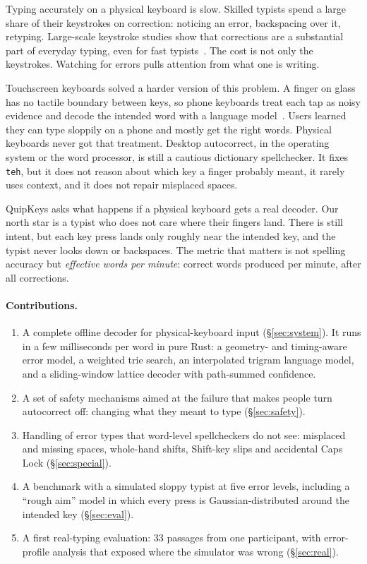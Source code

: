 \documentclass[11pt,a4paper]{article}
\newcommand{\qk}{QuipKeys}
\newcommand{\ttw}[1]{\texttt{#1}}
\begin{document}
Typing accurately on a physical keyboard is slow. Skilled typists spend a large share of their keystrokes on correction: noticing an error, backspacing over it, retyping. Large-scale keystroke studies show that corrections are a substantial part of everyday typing, even for fast typists~\citep{dhakal2018}. The cost is not only the keystrokes. Watching for errors pulls attention from what one is writing.

Touchscreen keyboards solved a harder version of this problem. A finger on glass has no tactile boundary between keys, so phone keyboards treat each tap as noisy evidence and decode the intended word with a language model~\citep{goodman2002,kristensson2004,vertanen2015}. Users learned they can type sloppily on a phone and mostly get the right words. Physical keyboards never got that treatment. Desktop autocorrect, in the operating system or the word processor, is still a cautious dictionary spellchecker. It fixes \ttw{teh}, but it does not reason about which key a finger probably meant, it rarely uses context, and it does not repair misplaced spaces.

\qk{} asks what happens if a physical keyboard gets a real decoder. Our north star is a typist who does not care where their fingers land. There is still intent, but each key press lands only roughly near the intended key, and the typist never looks down or backspaces. The metric that matters is not spelling accuracy but \emph{effective words per minute}: correct words produced per minute, after all corrections.

\paragraph{Contributions.}
\begin{enumerate}
\item A complete offline decoder for physical-keyboard input (\S\ref{sec:system}). It runs in a few milliseconds per word in pure Rust: a geometry- and timing-aware error model, a weighted trie search, an interpolated trigram language model, and a sliding-window lattice decoder with path-summed confidence.
\item A set of safety mechanisms aimed at the failure that makes people turn autocorrect off: changing what they meant to type (\S\ref{sec:safety}).
\item Handling of error types that word-level spellcheckers do not see: misplaced and missing spaces, whole-hand shifts, Shift-key slips and accidental Caps Lock (\S\ref{sec:special}).
\item A benchmark with a simulated sloppy typist at five error levels, including a ``rough aim'' model in which every press is Gaussian-distributed around the intended key (\S\ref{sec:eval}).
\item A first real-typing evaluation: 33 passages from one participant, with error-profile analysis that exposed where the simulator was wrong (\S\ref{sec:real}).
\end{enumerate}
\end{document}
